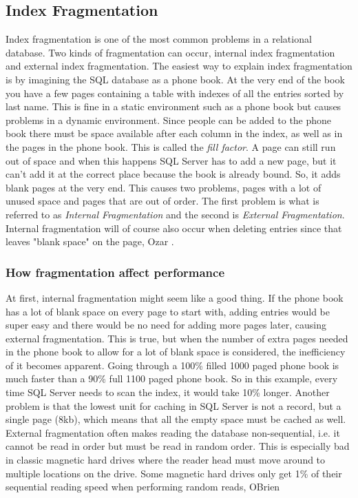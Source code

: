 \documentclass{cslthse-msc}
\begin{document}
\subsection{Index Fragmentation}
Index fragmentation is one of the most common problems in a relational database. Two kinds of fragmentation can occur, internal index fragmentation and external index fragmentation. The easiest way to explain index fragmentation is by imagining the SQL database as a phone book. At the very end of the book you have a few pages containing a table with indexes of all the entries sorted by last name. This is fine in a static environment such as a phone book but causes problems in a dynamic environment.
Since people can be added to the phone book there must be space available after each column in the index, as well as in the pages in the phone book. This is called the \emph{fill factor}. A page can still run out of space and when this happens SQL Server has to add a new page, but it can't add it at the correct place because the book is already bound. So, it adds blank pages at the very end. This causes two problems, pages with a lot of unused space and pages that are out of order. The first problem is what is referred to as \emph{Internal Fragmentation} and the second is \emph{External Fragmentation}. Internal fragmentation will of course also occur when deleting entries since that leaves "blank space" on the page, Ozar \cite{Ozar12}.

\subsubsection{How fragmentation affect performance}\label{sec:indexbad}
At first, internal fragmentation might seem like a good thing. If the phone book has a lot of blank space on every page to start with, adding entries would be super easy and there would be no need for adding more pages later, causing external fragmentation. This is true, but when the number of extra pages needed in the phone book to allow for a lot of blank space is considered, the inefficiency of it becomes apparent. Going through a 100\% filled 1000 paged phone book is much faster than a 90\% full 1100 paged phone book. So in this example, every time SQL Server needs to scan the index, it would take 10\% longer. Another problem is that the lowest unit for caching in SQL Server is not a record, but a single page (8kb), which means that all the empty space must be cached as well. \\

\noindent External fragmentation often makes reading the database non-sequential, i.e. it cannot be read in order but must be read in random order. This is especially bad in classic magnetic hard drives where the reader head must move around to multiple locations on the drive. Some magnetic hard drives only get 1\% of their sequential reading speed when performing random reads, OBrien \cite{Toshiba12}
\end{document}
